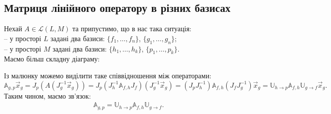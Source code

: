 \documentclass{math_library}
\begin{document}

\subsection{Матриця лінійного оператору в різних базисах}
Нехай $A \in \mathcal{L}(L,M)$ та припустимо, що в нас така ситуація:\\
-- у просторі $L$ задані два базиси: $\{f_1,\dots, f_n\}$, $\{g_1, \dots, g_n\}$;\\
-- у просторі $M$ задані два базиси: $\{h_1,\dots, h_k\}$, $\{p_1, \dots, p_k\}$.\\
Маємо більш складну діаграму:
\begin{center}
\end{center}
Із малюнку можемо виділити таке співвідношення між операторами:
\[
\mathbb{A}_{g,p} \vec{x}_g = J_p(A(J_g^{-1} \vec{x}_g)) = J_p(J_h^{-1} \mathbb{A}_{f,h} J_f)(J_g^{-1} \vec{x}_g) = (J_p J_h^{-1}) \mathbb{A}_{f,h} (J_f J_g^{-1})\vec{x}_g = \mathbb{U}_{h \to p} \mathbb{A}_{f,h} \mathbb{U}_{g \to f} \vec{x}_g.
\]
Таким чином, маємо зв'язок:
\begin{align*}
\mathbb{A}_{g,p} = \mathbb{U}_{h \to p} \mathbb{A}_{f,h} \mathbb{U}_{g \to f}.
\end{align*}
\end{document}
